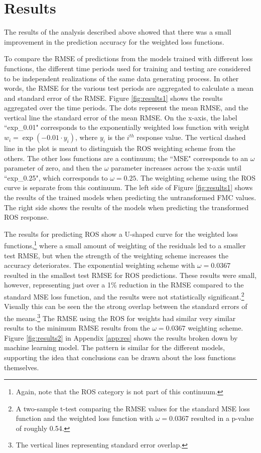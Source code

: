 \documentclass[11pt]{article}%
\begin{document}
\section{Results}

The results of the analysis described above showed that there was a small improvement in the prediction accuracy for the weighted loss functions.

To compare the RMSE of predictions from the models trained with different loss functions, the different time periods used for training and testing are considered to be independent realizations of the same data generating process. In other words, the RMSE for the various test periods are aggregated to calculate a mean and standard error of the RMSE. Figure \ref{fig:results1} shows the results aggregated over the time periods. The dots represent the mean RMSE, and the vertical line the standard error of the mean RMSE. On the x-axis, the label ``exp\_0.01" corresponds to the exponentially weighted loss function with weight $w_i = \exp(-0.01\cdot y_i)$, where $y_i$ is the $i^{th}$ response value. The vertical dashed line in the plot is meant to distinguish the ROS weighting scheme from the others. The other loss functions are a continuum; the ``MSE" corresponds to an $\omega$ parameter of zero, and then the $\omega$ parameter increases across the x-axis until ``exp\_0.25", which corresponds to $\omega=0.25$. The weighting scheme using the ROS curve is separate from this continuum. The left side of Figure \ref{fig:results1} shows the results of the trained models when predicting the untransformed FMC values. The right side shows the results of the models when predicting the transformed ROS response.

The results for predicting ROS show a U-shaped curve for the weighted loss functions,\footnote{Again, note that the ROS category is not part of this continuum.} where a small amount of weighting of the residuals led to a smaller test RMSE, but when the strength of the weighting scheme increases the accuracy deteriorates. The exponential weighting scheme with $\omega = 0.0367$ resulted in the smallest test RMSE for ROS predictions. These results were small, however, representing just over a 1\% reduction in the RMSE compared to the standard MSE loss function, and the results were not statistically significant.\footnote{A two-sample t-test comparing the RMSE values for the standard MSE loss function and the weighted loss function with $\omega = 0.0367$ resulted in a p-value of roughly 0.54.} Visually this can be seen the the strong overlap between the standard errors of the means.\footnote{The vertical lines representing standard error overlap.} The RMSE using the ROS for weights had similar very similar results to the minimum RMSE results from the $\omega = 0.0367$ weighting scheme. Figure \ref{fig:results2} in Appendix \ref{app:res} shows the results broken down by machine learning model. The pattern is similar for the different models, supporting the idea that conclusions can be drawn about the loss functions themselves.
\end{document}
